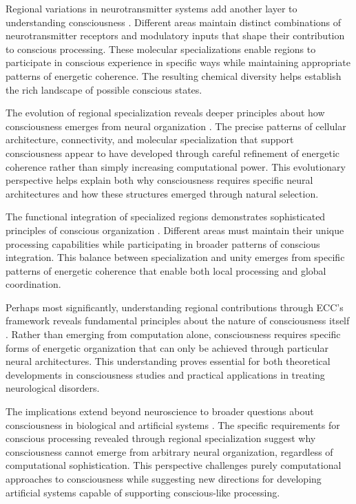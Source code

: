 \begin{refsection}
Regional variations in neurotransmitter systems add another layer to understanding consciousness \cite{Tononi2016}. Different areas maintain distinct combinations of neurotransmitter receptors and modulatory inputs that shape their contribution to conscious processing. These molecular specializations enable regions to participate in conscious experience in specific ways while maintaining appropriate patterns of energetic coherence. The resulting chemical diversity helps establish the rich landscape of possible conscious states.

The evolution of regional specialization reveals deeper principles about how consciousness emerges from neural organization \cite{Yu2015}. The precise patterns of cellular architecture, connectivity, and molecular specialization that support consciousness appear to have developed through careful refinement of energetic coherence rather than simply increasing computational power. This evolutionary perspective helps explain both why consciousness requires specific neural architectures and how these structures emerged through natural selection.

The functional integration of specialized regions demonstrates sophisticated principles of conscious organization \cite{Schmahmann2019}. Different areas must maintain their unique processing capabilities while participating in broader patterns of conscious integration. This balance between specialization and unity emerges from specific patterns of energetic coherence that enable both local processing and global coordination.

Perhaps most significantly, understanding regional contributions through ECC's framework reveals fundamental principles about the nature of consciousness itself \cite{Vogt2005}. Rather than emerging from computation alone, consciousness requires specific forms of energetic organization that can only be achieved through particular neural architectures. This understanding proves essential for both theoretical developments in consciousness studies and practical applications in treating neurological disorders.

The implications extend beyond neuroscience to broader questions about consciousness in biological and artificial systems \cite{Tononi2016}. The specific requirements for conscious processing revealed through regional specialization suggest why consciousness cannot emerge from arbitrary neural organization, regardless of computational sophistication. This perspective challenges purely computational approaches to consciousness while suggesting new directions for developing artificial systems capable of supporting conscious-like processing.


\end{refsection}
